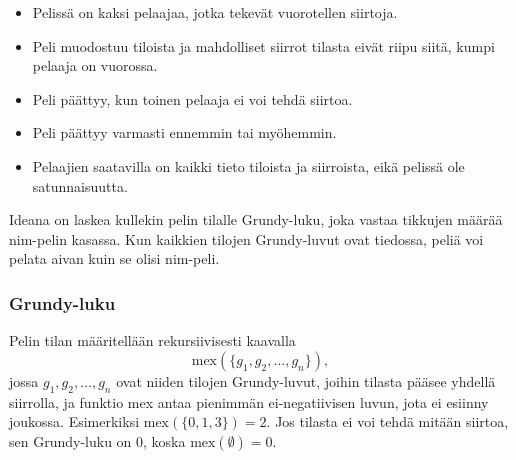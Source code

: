 \begin{itemize}[noitemsep]
\item Pelissä on kaksi pelaajaa, jotka tekevät vuorotellen siirtoja.
\item Peli muodostuu tiloista ja mahdolliset siirrot tilasta
eivät riipu siitä, kumpi pelaaja on vuorossa.
\item Peli päättyy, kun toinen pelaaja ei voi tehdä siirtoa.
\item Peli päättyy varmasti ennemmin tai myöhemmin.
\item Pelaajien saatavilla on kaikki tieto tiloista
ja siirroista, eikä pelissä ole satunnaisuutta.
\end{itemize}
Ideana on laskea kullekin pelin tilalle Grundy-luku,
joka vastaa tikkujen määrää nim-pelin kasassa.
Kun kaikkien tilojen Grundy-luvut ovat tiedossa,
peliä voi pelata aivan kuin se olisi nim-peli.

\subsubsection{Grundy-luku}


Pelin tilan  määritellään rekursiivisesti
kaavalla
\[\textrm{mex}(\{g_1,g_2,\ldots,g_n\}),\]
jossa $g_1,g_2,\ldots,g_n$ ovat niiden tilojen
Grundy-luvut, joihin tilasta pääsee yhdellä siirrolla,
ja funktio mex antaa pienimmän ei-negatiivisen
luvun, jota ei esiinny joukossa.
Esimerkiksi $\textrm{mex}(\{0,1,3\})=2$.
Jos tilasta ei voi tehdä mitään siirtoa,
sen Grundy-luku on 0, koska $\textrm{mex}(\emptyset)=0$.

